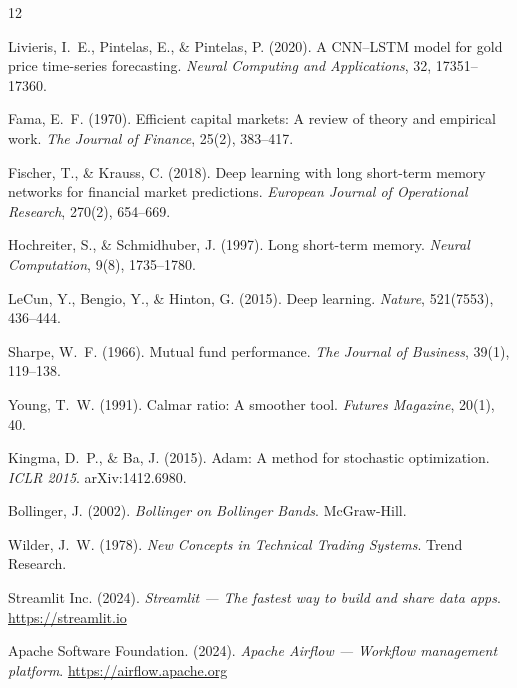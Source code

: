 \documentclass[12pt,a4paper]{article}
\begin{document}
\begin{thebibliography}{12}

Livieris, I.\ E., Pintelas, E., \& Pintelas, P. (2020).
A CNN--LSTM model for gold price time-series forecasting.
\textit{Neural Computing and Applications}, 32, 17351--17360.

Fama, E.\ F. (1970).
Efficient capital markets: A review of theory and empirical work.
\textit{The Journal of Finance}, 25(2), 383--417.

Fischer, T., \& Krauss, C. (2018).
Deep learning with long short-term memory networks for financial market
predictions.
\textit{European Journal of Operational Research}, 270(2), 654--669.

Hochreiter, S., \& Schmidhuber, J. (1997).
Long short-term memory.
\textit{Neural Computation}, 9(8), 1735--1780.

LeCun, Y., Bengio, Y., \& Hinton, G. (2015).
Deep learning.
\textit{Nature}, 521(7553), 436--444.

Sharpe, W.\ F. (1966).
Mutual fund performance.
\textit{The Journal of Business}, 39(1), 119--138.

Young, T.\ W. (1991).
Calmar ratio: A smoother tool.
\textit{Futures Magazine}, 20(1), 40.

Kingma, D.\ P., \& Ba, J. (2015).
Adam: A method for stochastic optimization.
\textit{ICLR 2015}. arXiv:1412.6980.

Bollinger, J. (2002).
\textit{Bollinger on Bollinger Bands}.
McGraw-Hill.

Wilder, J.\ W. (1978).
\textit{New Concepts in Technical Trading Systems}.
Trend Research.

Streamlit Inc. (2024).
\textit{Streamlit --- The fastest way to build and share data apps}.
\url{https://streamlit.io}

Apache Software Foundation. (2024).
\textit{Apache Airflow --- Workflow management platform}.
\url{https://airflow.apache.org}

\end{thebibliography}
\end{document}
